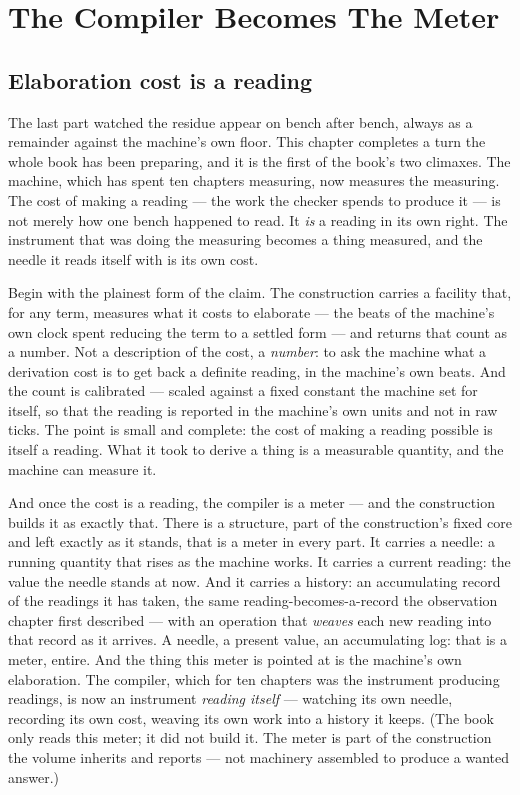\chapter{The Compiler Becomes The Meter}

\section{Elaboration cost is a reading}

The last part watched the residue appear on bench after bench, always as a remainder against the machine's own floor.
This chapter completes a turn the whole book has been preparing, and it is the first of the book's two climaxes. The
machine, which has spent ten chapters measuring, now measures the measuring. The cost of making a reading --- the work
the checker spends to produce it --- is not merely how one bench happened to read. It \emph{is} a reading in its own
right. The instrument that was doing the measuring becomes a thing measured, and the needle it reads itself with is its
own cost.

Begin with the plainest form of the claim. The construction carries a facility that, for any term, measures what it
costs to elaborate --- the beats of the machine's own clock spent reducing the term to a settled form --- and returns
that count as a number. Not a description of the cost, a \emph{number}: to ask the machine what a derivation cost is to
get back a definite reading, in the machine's own beats. And the count is calibrated --- scaled against a fixed
constant the machine set for itself, so that the reading is reported in the machine's own units and not in raw ticks.
The point is small and complete: the cost of making a reading possible is itself a reading. What it took to derive a
thing is a measurable quantity, and the machine can measure it.

And once the cost is a reading, the compiler is a meter --- and the construction builds it as exactly that. There is a
structure, part of the construction's fixed core and left exactly as it stands, that is a meter in every part. It carries a
needle: a running quantity that rises as the machine works. It carries a current reading: the value the needle stands
at now. And it carries a history: an accumulating record of the readings it has taken, the same reading-becomes-a-record
the observation chapter first described --- with an operation that \emph{weaves} each new reading into that record as it
arrives. A needle, a present value, an accumulating log: that is a meter, entire. And the thing this meter is pointed at
is the machine's own elaboration. The compiler, which for ten chapters was the instrument producing readings, is now an
instrument \emph{reading itself} --- watching its own needle, recording its own cost, weaving its own work into a
history it keeps. (The book only reads this meter; it did not build it. The meter is part of the construction the
volume inherits and reports --- not machinery assembled to produce a wanted answer.)

